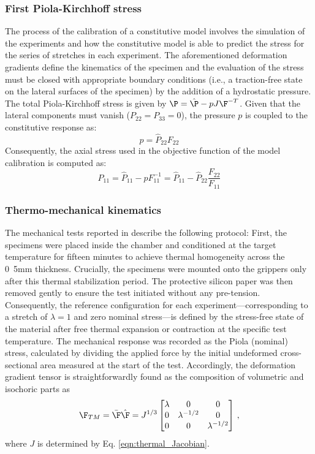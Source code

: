 \subsubsection{First Piola-Kirchhoff stress}

The process of the calibration of a constitutive model involves the simulation of the experiments and how the constitutive model is able to predict the stress for the series of stretches in each experiment. The aforementioned deformation gradients define the kinematics of the specimen and the evaluation of the stress must be closed with appropriate boundary conditions (i.e., a traction-free state on the lateral surfaces of the specimen) by the addition of a hydrostatic pressure. The total Piola-Kirchhoff stress is given by $\P = \hat\P - pJ\F^{-T}$. Given that the lateral components must vanish ($P_{22} = P_{33} = 0$), the pressure $p$ is coupled to the constitutive response as:
\begin{equation}
  p = \hat P_{22} F_{22}
\end{equation}
Consequently, the axial stress used in the objective function of the model calibration is computed as:
\begin{equation}
  P_{11} = \hat P_{11} - pF_{11}^{-1} = \hat P_{11} - \hat P_{22} \frac{F_{22}}{F_{11}}
\end{equation}


\subsubsection{Thermo-mechanical kinematics}

The mechanical tests reported in \cite{Liao_Mokarram2020,Alkhoury2022} describe the following protocol: First, the specimens were placed inside the chamber and conditioned at the target temperature for fifteen minutes to achieve thermal homogeneity across the \si{0.5}{mm} thickness. Crucially, the specimens were mounted onto the grippers only after this thermal stabilization period. The protective silicon paper was then removed gently to ensure the test initiated without any pre-tension. Consequently, the reference configuration for each experiment—corresponding to a stretch of $\lambda=1$ and zero nominal stress—is defined by the stress-free state of the material after free thermal expansion or contraction at the specific test temperature. The mechanical response was recorded as the Piola (nominal) stress, calculated by dividing the applied force by the initial undeformed cross-sectional area measured at the start of the test.
Accordingly, the deformation gradient tensor is straightforwardly found as the composition of volumetric and isochoric parts as
\begin{equation}
  \label{eqn:F_thermo_mech_1}
  \F_{TM} = \bar\F \hat\F = J^{1/3} \begin{bmatrix}
    \lambda & 0 & 0 \\
    0 & \lambda^{-1/2} & 0 \\
    0 & 0 & \lambda^{-1/2} \\
  \end{bmatrix} \,,
\end{equation}
where $J$ is determined by Eq. \eqref{eqn:thermal_Jacobian}.


